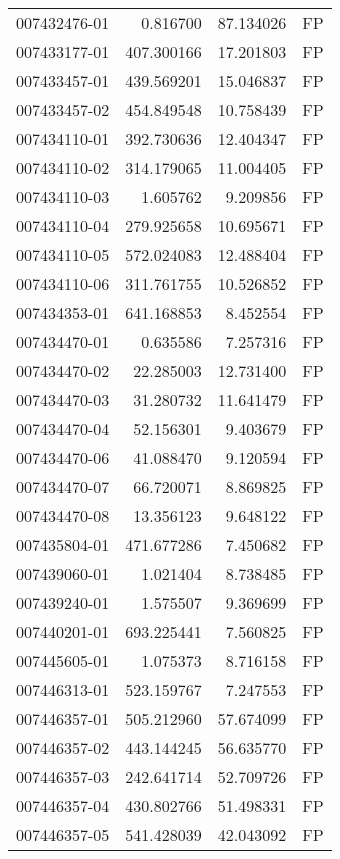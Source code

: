 \begin{tabular}{lrrl}
007432476-01 &    0.816700 &    87.134026 &   FP \\
007433177-01 &  407.300166 &    17.201803 &   FP \\
007433457-01 &  439.569201 &    15.046837 &   FP \\
007433457-02 &  454.849548 &    10.758439 &   FP \\
007434110-01 &  392.730636 &    12.404347 &   FP \\
007434110-02 &  314.179065 &    11.004405 &   FP \\
007434110-03 &    1.605762 &     9.209856 &   FP \\
007434110-04 &  279.925658 &    10.695671 &   FP \\
007434110-05 &  572.024083 &    12.488404 &   FP \\
007434110-06 &  311.761755 &    10.526852 &   FP \\
007434353-01 &  641.168853 &     8.452554 &   FP \\
007434470-01 &    0.635586 &     7.257316 &   FP \\
007434470-02 &   22.285003 &    12.731400 &   FP \\
007434470-03 &   31.280732 &    11.641479 &   FP \\
007434470-04 &   52.156301 &     9.403679 &   FP \\
007434470-06 &   41.088470 &     9.120594 &   FP \\
007434470-07 &   66.720071 &     8.869825 &   FP \\
007434470-08 &   13.356123 &     9.648122 &   FP \\
007435804-01 &  471.677286 &     7.450682 &   FP \\
007439060-01 &    1.021404 &     8.738485 &   FP \\
007439240-01 &    1.575507 &     9.369699 &   FP \\
007440201-01 &  693.225441 &     7.560825 &   FP \\
007445605-01 &    1.075373 &     8.716158 &   FP \\
007446313-01 &  523.159767 &     7.247553 &   FP \\
007446357-01 &  505.212960 &    57.674099 &   FP \\
007446357-02 &  443.144245 &    56.635770 &   FP \\
007446357-03 &  242.641714 &    52.709726 &   FP \\
007446357-04 &  430.802766 &    51.498331 &   FP \\
007446357-05 &  541.428039 &    42.043092 &   FP \\

\end{tabular}

